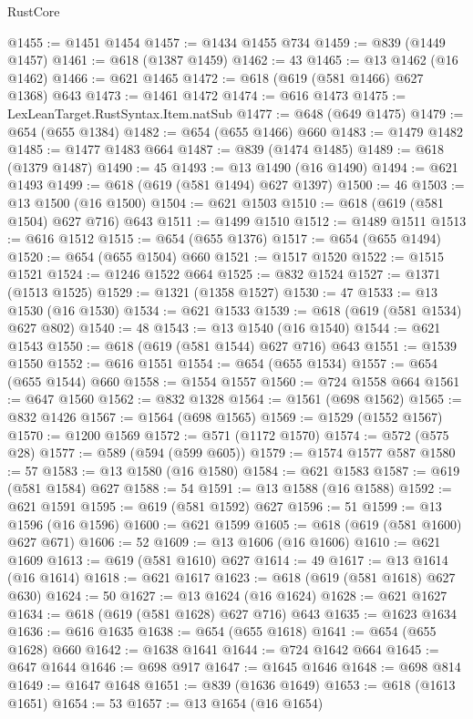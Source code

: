 \begin{lexlean}{RustCore}
\begin{coremodule}
@1455 := @1451 @1454
@1457 := @1434 @1455 @734
@1459 := @839 (@1449 @1457)
@1461 := @618 (@1387 @1459)
@1462 := 43
@1465 := @13 @1462 (@16 @1462)
@1466 := @621 @1465
@1472 := @618 (@619 (@581 @1466) @627 @1368) @643
@1473 := @1461 @1472
@1474 := @616 @1473
@1475 := LexLeanTarget.RustSyntax.Item.natSub
@1477 := @648 (@649 @1475)
@1479 := @654 (@655 @1384)
@1482 := @654 (@655 @1466) @660
@1483 := @1479 @1482
@1485 := @1477 @1483 @664
@1487 := @839 (@1474 @1485)
@1489 := @618 (@1379 @1487)
@1490 := 45
@1493 := @13 @1490 (@16 @1490)
@1494 := @621 @1493
@1499 := @618 (@619 (@581 @1494) @627 @1397)
@1500 := 46
@1503 := @13 @1500 (@16 @1500)
@1504 := @621 @1503
@1510 := @618 (@619 (@581 @1504) @627 @716) @643
@1511 := @1499 @1510
@1512 := @1489 @1511
@1513 := @616 @1512
@1515 := @654 (@655 @1376)
@1517 := @654 (@655 @1494)
@1520 := @654 (@655 @1504) @660
@1521 := @1517 @1520
@1522 := @1515 @1521
@1524 := @1246 @1522 @664
@1525 := @832 @1524
@1527 := @1371 (@1513 @1525)
@1529 := @1321 (@1358 @1527)
@1530 := 47
@1533 := @13 @1530 (@16 @1530)
@1534 := @621 @1533
@1539 := @618 (@619 (@581 @1534) @627 @802)
@1540 := 48
@1543 := @13 @1540 (@16 @1540)
@1544 := @621 @1543
@1550 := @618 (@619 (@581 @1544) @627 @716) @643
@1551 := @1539 @1550
@1552 := @616 @1551
@1554 := @654 (@655 @1534)
@1557 := @654 (@655 @1544) @660
@1558 := @1554 @1557
@1560 := @724 @1558 @664
@1561 := @647 @1560
@1562 := @832 @1328
@1564 := @1561 (@698 @1562)
@1565 := @832 @1426
@1567 := @1564 (@698 @1565)
@1569 := @1529 (@1552 @1567)
@1570 := @1200 @1569
@1572 := @571 (@1172 @1570)
@1574 := @572 (@575 @28)
@1577 := @589 (@594 (@599 @605))
@1579 := @1574 @1577 @587
@1580 := 57
@1583 := @13 @1580 (@16 @1580)
@1584 := @621 @1583
@1587 := @619 (@581 @1584) @627
@1588 := 54
@1591 := @13 @1588 (@16 @1588)
@1592 := @621 @1591
@1595 := @619 (@581 @1592) @627
@1596 := 51
@1599 := @13 @1596 (@16 @1596)
@1600 := @621 @1599
@1605 := @618 (@619 (@581 @1600) @627 @671)
@1606 := 52
@1609 := @13 @1606 (@16 @1606)
@1610 := @621 @1609
@1613 := @619 (@581 @1610) @627
@1614 := 49
@1617 := @13 @1614 (@16 @1614)
@1618 := @621 @1617
@1623 := @618 (@619 (@581 @1618) @627 @630)
@1624 := 50
@1627 := @13 @1624 (@16 @1624)
@1628 := @621 @1627
@1634 := @618 (@619 (@581 @1628) @627 @716) @643
@1635 := @1623 @1634
@1636 := @616 @1635
@1638 := @654 (@655 @1618)
@1641 := @654 (@655 @1628) @660
@1642 := @1638 @1641
@1644 := @724 @1642 @664
@1645 := @647 @1644
@1646 := @698 @917
@1647 := @1645 @1646
@1648 := @698 @814
@1649 := @1647 @1648
@1651 := @839 (@1636 @1649)
@1653 := @618 (@1613 @1651)
@1654 := 53
@1657 := @13 @1654 (@16 @1654)

\end{coremodule}
\end{lexlean}
